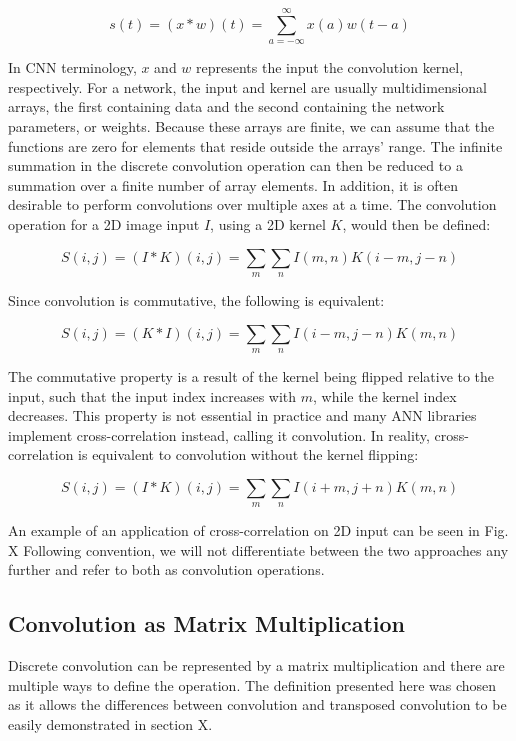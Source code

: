 $$s(t) = (x*w)(t) = \sum_{a=-\infty}^{\infty} x(a)w(t-a)$$

\noindent In CNN terminology, $x$ and $w$ represents the input the convolution kernel, respectively. For a network, the input and kernel are usually multidimensional arrays, the first containing data and the second containing the network parameters, or weights. Because these arrays are finite, we can assume that the functions are zero for elements that reside outside the arrays' range. The infinite summation in the discrete convolution operation can then be reduced to a summation over a finite number of array elements. In addition, it is often desirable to perform convolutions over multiple axes at a time. The convolution operation for a 2D image input $I$, using a 2D kernel $K$, would then be defined:

$$S(i, j) = (I*K)(i, j) = \sum_{m} \sum_{n} I(m, n) K(i-m, j-n)$$

\noindent Since convolution is commutative, the following is equivalent:

$$S(i, j) = (K*I)(i, j) = \sum_{m} \sum_{n} I(i-m, j-n) K(m, n)$$

\noindent The commutative property is a result of the kernel being flipped relative to the input, such that the input index increases with $m$, while the kernel index decreases. This property is not essential in practice and many ANN libraries implement cross-correlation instead, calling it convolution. In reality, cross-correlation is equivalent to convolution without the kernel flipping:

$$S(i, j) = (I*K)(i, j) = \sum_{m} \sum_{n} I(i+m, j+n) K(m, n)$$

\noindent An example of an application of cross-correlation on 2D input can be seen in Fig. X Following convention, we will not differentiate between the two approaches any further and refer to both as convolution operations. 
 
\subsection{Convolution as Matrix Multiplication}
 
Discrete convolution can be represented by a matrix multiplication and there are multiple ways to define the operation. The definition presented here was chosen as it allows the differences between convolution and transposed convolution to be easily demonstrated in section X. \\

